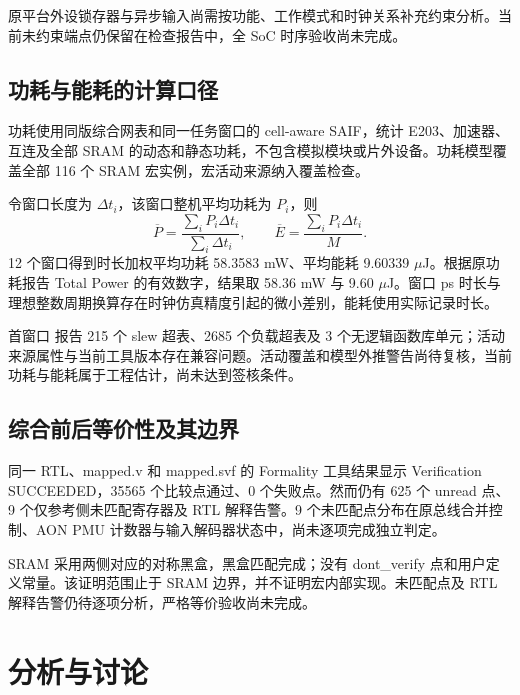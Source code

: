 \documentclass[UTF8,punct,fontset=none,zihao=-4]{ctexart}
\newcommand{\code}[1]{\texttt{\detokenize{#1}}}
\begin{document}
原平台外设锁存器与异步输入尚需按功能、工作模式和时钟关系补充约束分析。当前未约束端点仍保留在检查报告中，全 SoC 时序验收尚未完成。

\subsection{功耗与能耗的计算口径}
功耗使用同版综合网表和同一任务窗口的 cell-aware SAIF，统计 E203、加速器、互连及全部 SRAM 的动态和静态功耗，不包含模拟模块或片外设备。功耗模型覆盖全部 116 个 SRAM 宏实例，宏活动来源纳入覆盖检查。

令窗口长度为 $\Delta t_i$，该窗口整机平均功耗为 $P_i$，则
\[
\overline P=\frac{\sum_iP_i\Delta t_i}{\sum_i\Delta t_i},\qquad
\overline E=\frac{\sum_iP_i\Delta t_i}{M}.
\]
12 个窗口得到时长加权平均功耗 58.3583 mW、平均能耗 9.60339 $\mu$J。根据原功耗报告 Total Power 的有效数字，结果取 58.36 mW 与 9.60 $\mu$J。窗口 ps 时长与理想整数周期换算存在时钟仿真精度引起的微小差别，能耗使用实际记录时长。

\begin{table}[H]\centering\small
\caption{12 个历史完整任务及对应功耗窗口}

\end{table}

首窗口 \code{check_power} 报告 215 个 slew 超表、2685 个负载超表及 3 个无逻辑函数库单元；活动来源属性与当前工具版本存在兼容问题。活动覆盖和模型外推警告尚待复核，当前功耗与能耗属于工程估计，尚未达到签核条件。



\subsection{综合前后等价性及其边界}
同一 RTL、mapped.v 和 mapped.svf 的 Formality 工具结果显示 Verification SUCCEEDED，35565 个比较点通过、0 个失败点。然而仍有 625 个 unread 点、9 个仅参考侧未匹配寄存器及 RTL 解释告警。9 个未匹配点分布在原总线合并控制、AON PMU 计数器与输入解码器状态中，尚未逐项完成独立判定。

SRAM 采用两侧对应的对称黑盒，黑盒匹配完成；没有 dont\_verify 点和用户定义常量。该证明范围止于 SRAM 边界，并不证明宏内部实现。未匹配点及 RTL 解释告警仍待逐项分析，严格等价验收尚未完成。



\section{分析与讨论}
\end{document}
